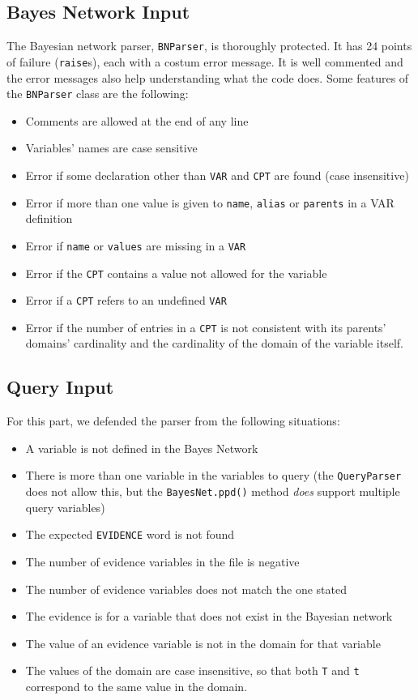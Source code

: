 \documentclass[11pt,a4paper]{article}
\begin{document}
\subsection{Bayes Network Input}
The Bayesian network parser, \texttt{BNParser}, is thoroughly protected. It has 24 points of failure (\texttt{raise}s), each with a costum error message. It is well commented and the error messages also help understanding what the code does. Some features of the \texttt{BNParser} class are the following:

\begin{itemize}
	\setlength\itemsep{0em}
    \item Comments are allowed at the end of any line
    \item Variables' names are case sensitive
    \item Error if some declaration other than \texttt{VAR} and \texttt{CPT} are found (case insensitive)
    \item Error if more than one value is given to \texttt{name}, \texttt{alias} or \texttt{parents} in a VAR definition
    \item Error if \texttt{name} or \texttt{values} are missing in a \texttt{VAR}
    \item Error if the \texttt{CPT} contains a value not allowed for the variable
    \item Error if a \texttt{CPT} refers to an undefined \texttt{VAR}
    \item Error if the number of entries in a \texttt{CPT} is not consistent with its parents' domains' cardinality and the cardinality of the domain of the variable itself.
\end{itemize}

\subsection{Query Input}
For this part, we defended the parser from the following situations:

\begin{itemize}
	\setlength\itemsep{0em}
    \item A variable is not defined in the Bayes Network
    \item There is more than one variable in the variables to query (the \texttt{QueryParser} does not allow this, but the \texttt{BayesNet.ppd()} method \emph{does} support multiple query variables)
    \item The expected \texttt{EVIDENCE} word is not found
    \item The number of evidence variables in the file is negative
    \item The number of evidence variables does not match the one stated
    \item The evidence is for a variable that does not exist in the Bayesian network
    \item The value of an evidence variable is not in the domain for that variable
    \item The values of the domain are case insensitive, so that both \texttt{T} and \texttt{t} correspond to the same value in the domain.
\end{itemize}
\end{document}
